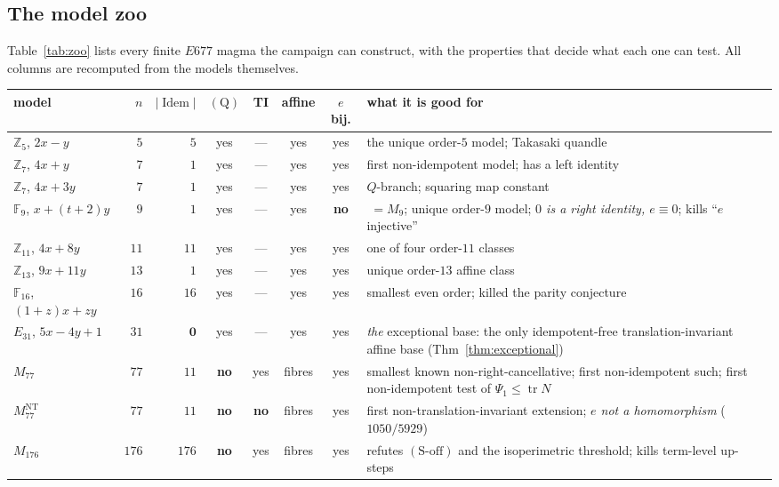 \documentclass[11pt]{article}
\theoremstyle{plain}
\theoremstyle{definition}
\theoremstyle{remark}
\numberwithin{equation}{section}
\newcommand{\Z}{\mathbb{Z}}
\newcommand{\F}{\mathbb{F}}
\newcommand{\tr}{\operatorname{tr}}
\newcommand{\Idem}{\operatorname{Idem}}
\begin{document}
\subsection{The model zoo}\label{sec:zoo}

Table~\ref{tab:zoo} lists every finite $E677$ magma the campaign can construct,
with the properties that decide what each one can test. All columns are recomputed
from the models themselves.

\begin{table}[htbp]
\centering
{\footnotesize
\setlength{\tabcolsep}{4pt}
\begin{tabular}{lrrcccc>{\raggedright\arraybackslash}p{}}
\toprule
model & $n$ & $|\Idem|$ & $(\mathrm{Q})$ & TI & affine & $e$ bij. & what it is good for\\
\midrule
$\Z_5$, $2x-y$ & $5$ & $5$ & yes & --- & yes & yes & the unique order-$5$ model; Takasaki quandle\\
$\Z_7$, $4x+y$ & $7$ & $1$ & yes & --- & yes & yes & first non-idempotent model; has a left identity\\
$\Z_7$, $4x+3y$ & $7$ & $1$ & yes & --- & yes & yes & $Q$-branch; squaring map constant\\
$\F_9$, $x+(t+2)y$ & $9$ & $1$ & yes & --- & yes & \textbf{no} & $\;=M_9$; unique order-$9$ model; \emph{$0$ is a right identity, $e\equiv0$}; kills ``$e$ injective''\\
$\Z_{11}$, $4x+8y$ & $11$ & $11$ & yes & --- & yes & yes & one of four order-$11$ classes\\
$\Z_{13}$, $9x+11y$ & $13$ & $1$ & yes & --- & yes & yes & unique order-$13$ affine class\\
$\F_{16}$, $(1+z)x+zy$ & $16$ & $16$ & yes & --- & yes & yes & smallest even order; killed the parity conjecture\\
$E_{31}$, $5x-4y+1$ & $31$ & $\mathbf{0}$ & yes & --- & yes & yes & \emph{the} exceptional base: the only idempotent-free translation-invariant affine base (Thm~\ref{thm:exceptional})\\
$M_{77}$ & $77$ & $11$ & \textbf{no} & yes & fibres & yes & smallest known non-right-cancellative; first non-idempotent such; first non-idempotent test of $\Psi_1\le\tr N$\\
$M_{77}^{\mathrm{NT}}$ & $77$ & $11$ & \textbf{no} & \textbf{no} & fibres & yes & first non-translation-invariant extension; \emph{$e$ not a homomorphism} ($1050/5929$)\\
$M_{176}$ & $176$ & $176$ & \textbf{no} & yes & fibres & yes & refutes $(\mathrm{S\text{-}off})$ and the isoperimetric threshold; kills term-level up-steps\\

\end{tabular}}
\end{table}
\end{document}
